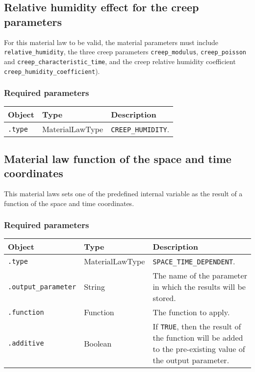 \documentclass[10pt]{article}
\begin{document}
\subsection{Relative humidity effect for the creep parameters}

For this material law to be valid, the material parameters must include \verb+relative_humidity+, the three creep parameters \verb+creep_modulus+, \verb+creep_poisson+ and \verb+creep_characteristic_time+, and the creep relative humidity coefficient \verb+creep_humidity_coefficient+).

\subsubsection*{Required parameters}

\begin{tabularx}{\textwidth}{llX}
\hline 
Object & Type & Description \\ 
\hline 
\verb+.type+ & MaterialLawType & \verb+CREEP_HUMIDITY+. \\ 
\hline 
\end{tabularx}

\subsection{Material law function of the space and time coordinates}

This material laws sets one of the predefined internal variable as the result of a function of the space and time coordinates.

\subsubsection*{Required parameters}

\begin{tabularx}{\textwidth}{llX}
\hline 
Object & Type & Description \\ 
\hline 
\verb+.type+ & MaterialLawType & \verb+SPACE_TIME_DEPENDENT+. \\ 
\verb+.output_parameter+ & String & The name of the parameter in which the results will be stored.\\
\verb+.function+ & Function & The function to apply.\\
\verb+.additive+ & Boolean & If \verb+TRUE+, then the result of the function will be added to the pre-existing value of the output parameter.\\
\hline 
\end{tabularx}
\end{document}
